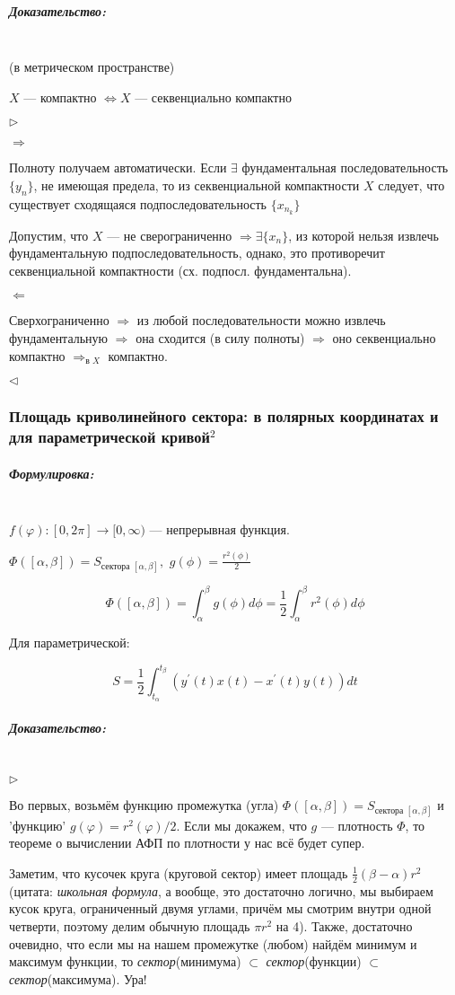 \documentclass{article}
\def\dbl{\,\,}
\let\vanillasubparagraph\subparagraph
\renewcommand{\subparagraph}[1]{\vanillasubparagraph{#1}\mbox{}\\}
\begin{document}
\subparagraph{Доказательство: }
(в метрическом пространстве)

$X$ --- компактно $\Leftrightarrow X$ --- секвенциально компактно

$\rhd$

$\Rightarrow$

Полноту получаем автоматически. Если $\exists$ фундаментальная последовательность $\{y_n\}$, не имеющая предела, то из секвенциальной компактности $X$ следует, что существует сходящаяся подпоследовательность $\{x_{n_k}\}$

Допустим, что $X$ --- не сверограниченно $\Rightarrow \exists \{x_n\}$, из которой нельзя извлечь фундаментальную подпоследовательность, однако, это противоречит секвенциальной компактности (сх. подпосл. фундаментальна).

$\Leftarrow$

Сверхограниченно $\Rightarrow$ из любой последовательности можно извлечь фундаментальную $\Rightarrow$ она сходится (в силу полноты) $\Rightarrow$ оно секвенциально компактно $\Rightarrow_{\text{в } X}$ компактно.

$\lhd$

\subsubsection{Площадь криволинейного сектора: в полярных координатах и для параметрической кривой\texorpdfstring{$^2$}{}}

\subparagraph{Формулировка:}

$f(\varphi): [0, 2\pi] \rightarrow [0, \infty)$ --- непрерывная функция.

$\Phi([\alpha, \beta]) = S_{\text{сектора } [\alpha, \beta]}, \dbl g(\phi) = \frac{r^2(\phi)}{2}$

\[\Phi([\alpha, \beta]) = \int_\alpha^\beta{g(\phi)d\phi} = \frac{1}{2}\int_\alpha^\beta{r^2(\phi)d\phi}\]

Для параметрической:

\[S =  \frac{1}{2}\int_{t_\alpha}^{t_\beta}{(y^\prime(t)x(t) - x^\prime(t)y(t))dt}\]

\subparagraph{Доказательство:}

$\rhd$

Во первых, возьмём функцию промежутка (угла) $\Phi([\alpha, \beta]) = S_{\text{сектора }[\alpha, \beta]}$ и 'функцию' $g(\varphi) = r^2(\varphi)/2$. Если мы докажем, что $g$ --- плотность $\Phi$, то теореме о вычислении АФП по плотности у нас всё будет супер.

Заметим, что кусочек круга (круговой сектор) имеет площадь $\frac{1}{2}(\beta - \alpha) r^2$ (цитата: \textit{школьная формула}, а вообще, это достаточно логично, мы выбираем кусок круга, ограниченный двумя углами, причём мы смотрим внутри одной четверти, поэтому делим обычную площадь $\pi r^2$ на 4). Также, достаточно очевидно, что если мы на нашем промежутке (любом) найдём минимум и максимум функции, то \textit{сектор}(минимума) $\subset$ \textit{сектор}(функции) $\subset$ \textit{сектор}(максимума). Ура! 
\end{document}

